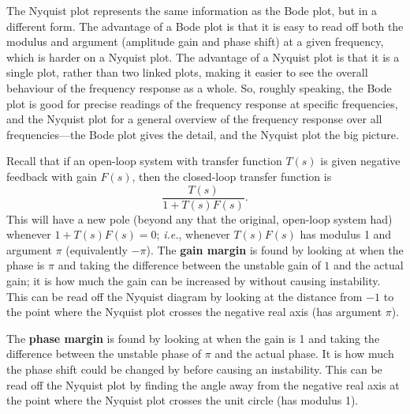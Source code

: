 \documentclass{article}
\begin{document}
The Nyquist plot represents the same information as the Bode plot, but in a different form. The advantage of a Bode plot is that it is easy to read off both the modulus and argument (amplitude gain and phase shift) at a given frequency, which is harder on a Nyquist plot. The advantage of a Nyquist plot is that it is a single plot, rather than two linked plots, making it easier to see the overall behaviour of the frequency response as a whole. So, roughly speaking, the Bode plot is good for precise readings of the frequency response at specific frequencies, and the Nyquist plot for a general overview of the frequency response over all frequencies---the Bode plot gives the detail, and the Nyquist plot the big picture.\bigskip



Recall that if an open-loop system with transfer function $T(s)$ is given negative feedback with gain $F(s)$, then the closed-loop transfer function is
\[\frac{T(s)}{1+T(s)F(s)}.\]
This will have a new pole (beyond any that the original, open-loop system had) whenever $1+T(s)F(s)=0$; \textit{i.e.}, whenever $T(s)F(s)$ has modulus 1 and argument $\pi$ (equivalently $-\pi$). The \textbf{gain margin} is found by looking at when the phase is $\pi$ and taking the difference between the unstable gain of $1$ and the actual gain; it is how much the gain can be increased by without causing instability. This can be read off the Nyquist diagram by looking at the distance from $-1$ to the point where the Nyquist plot crosses the negative real axis (has argument $\pi$).

The \textbf{phase margin} is found by looking at when the gain is 1 and taking the difference between the unstable phase of $\pi$ and the actual phase. It is how much the phase shift could be changed by before causing an instability. This can be read off the Nyquist plot by finding the angle away from the negative real axis at the point where the Nyquist plot crosses the unit circle (has modulus 1).

\clearpage
\end{document}
